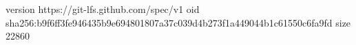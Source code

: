 version https://git-lfs.github.com/spec/v1
oid sha256:b9f6ff3fe946435b9e694801807a37c039d4b273f1a449044b1c61550c6fa9fd
size 22860

